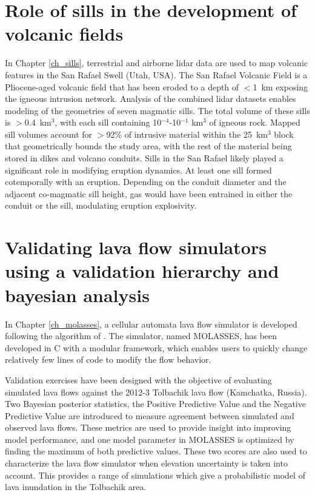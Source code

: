 \section{Role of sills in the development of volcanic fields}
In Chapter \ref{ch_sills}, terrestrial and airborne lidar data are used to map volcanic features in the San Rafael Swell (Utah, USA). The San Rafael Volcanic Field is a Pliocene-aged volcanic field that has been eroded to a depth of $<$1~km exposing the igneous intrusion network. Analysis of the combined lidar datasets enables modeling of the geometries of seven magmatic sills. The total volume of these sills is $>$0.4~km$^3$, with each sill containing 10$^{-4}$-10$^{-1}$ km$^3$ of igneous rock. Mapped sill volumes account for $>$92\% of intrusive material within the 25~km$^3$ block that geometrically bounds the study area, with the rest of the material being stored in dikes and volcano conduits.
Sills in the San Rafael likely played a significant role in modifying eruption dynamics. At least one sill formed cotemporally with an eruption. Depending on the conduit diameter and the adjacent co-magmatic sill height, gas would have been entrained in either the conduit or the sill, modulating eruption explosivity.

\section{Validating lava flow simulators using a validation hierarchy and bayesian analysis}
In Chapter \ref{ch_molasses}, a cellular automata \citep{wolfram1984cellular} lava flow simulator is developed following the algorithm of \citet{connor2012probabilistic}. The simulator, named MOLASSES, has been developed in C with a modular framework, which enables users to quickly change relatively few lines of code to modify the flow behavior.

Validation exercises have been designed with the objective of evaluating simulated lava flows against the 2012-3 Tolbachik lava flow (Kamchatka, Russia). Two Bayesian posterior statistics, the Positive Predictive Value and the Negative Predictive Value are introduced to measure agreement between simulated and observed lava flows. These metrics are used to provide insight into improving model performance, and one model parameter in MOLASSES is optimized by finding the maximum of both predictive values. These two scores are also used to characterize the lava flow simulator when elevation uncertainty is taken into account. This provides a range of simulations which give a probabilistic model of lava inundation in the Tolbachik area.

